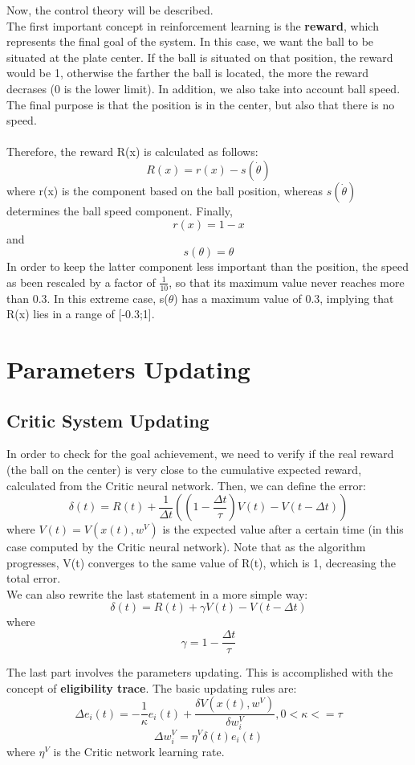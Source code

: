 \documentclass{article}
\begin{document}
Now, the control theory will be described. \\
The first important concept in reinforcement learning is the \textbf{reward}, which represents the final goal of the system. In this case, we want the ball to be situated at the plate center. If the ball is situated on that position, the reward would be 1, otherwise the farther the ball is located, the more the reward decrases (0 is the lower limit). In addition, we also take into account ball speed. The final purpose is that the position is in the center, but also that there is no speed. \\ \\

Therefore, the reward R(x) is calculated as follows:
\[
R(x) = r(x) - s(\dot{\theta})
\]
where r(x) is the component based on the ball position, whereas \(s(\dot{\theta})\) determines the ball speed component. Finally,
\[
r(x) = 1 - x
\]
and
\[
s(\theta) = \theta
\]
In order to keep the latter component less important than the position, the speed as been rescaled by a factor of \(\frac{1}{10}\), so that its maximum value never reaches more than 0.3. In this extreme case, s(\(\theta\)) has a maximum value of 0.3, implying that R(x) lies in a range of [-0.3;1].


\section{Parameters Updating}

\subsection{Critic System Updating}
In order to check for the goal achievement, we need to verify if the real reward (the ball on the center) is very close to the cumulative expected reward, calculated from the Critic neural network. Then, we can define the error:
\[
\delta(t) = R(t) + \frac{1}{\Delta t}((1 - \frac{\Delta t}{\tau})V(t) - V(t - \Delta t))
\]
where \(V(t)=V(x(t), w^{V})\) is the expected value after a certain time (in this case computed by the Critic neural network). Note that as the algorithm progresses, V(t) converges to the same value of R(t), which is 1, decreasing the total error.\\
We can also rewrite the last statement in a more simple way:
\[
\delta(t) = R(t) + \gamma V(t) - V(t - \Delta t)
\]
where
\[
\gamma = 1 - \frac{\Delta t}{\tau}
\]

The last part involves the parameters updating. This is accomplished with the concept of \textbf{eligibility trace}. The basic updating rules are:
\[
\Delta e_{i}(t) = -\frac{1}{\kappa}e_{i}(t) + \frac{\delta V(x(t), w^{V})}{\delta w_{i}^{V}}, 0 < \kappa <= \tau
\]
\[
\Delta w_{i}^{V} = \eta^{V} \delta (t)e_{i}(t)
\]
where \(\eta^{V}\) is the Critic network learning rate. \\ \\
\end{document}
